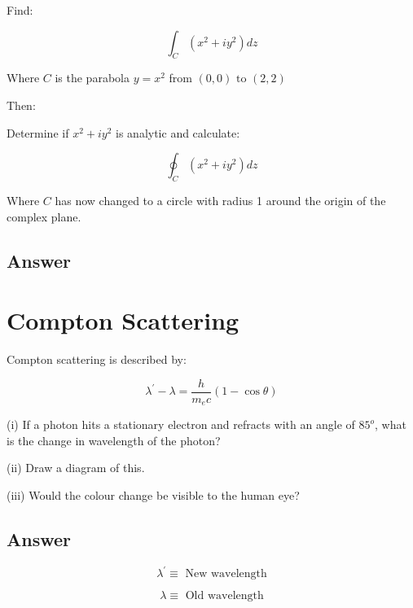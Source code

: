 \documentclass{article}
\begin{document}
Find:

\begin{equation}
  \int^{}_{C} \left( x^2 + i y^2 \right) dz
\end{equation}

Where $C$ is the parabola $y = x^{2}_{}$ from $(0,0) \text{ to } (2,2)$

\vspace{0.5cm}

Then:

Determine if $x^2 + iy^2$ is analytic and calculate:

\begin{equation}
  \oint^{}_{C} \left( x^2 + i y^2 \right) dz 
\end{equation}

Where $C$ has now changed to a circle with radius 1 around the origin of the 
complex plane. 

\subsection{Answer}




\clearpage
\section{Compton Scattering}

Compton scattering is described by:

\begin{equation} \label{compton}
  \lambda^{'}_{} - \lambda = \frac{h}{m_{e} c} \left( 1 - \cos\theta  \right)
\end{equation}

(i) If a photon hits a stationary electron and refracts with an angle of $85^{o}$, 
what is the change in wavelength of the photon?

(ii) Draw a diagram of this.

(iii) Would the colour change be visible to the human eye?

\subsection{Answer}

\begin{equation}
  \lambda^{'} \equiv \text{ New wavelength}
\end{equation}

\begin{equation}
  \lambda \equiv \text{ Old wavelength}
\end{equation}
\end{document}
